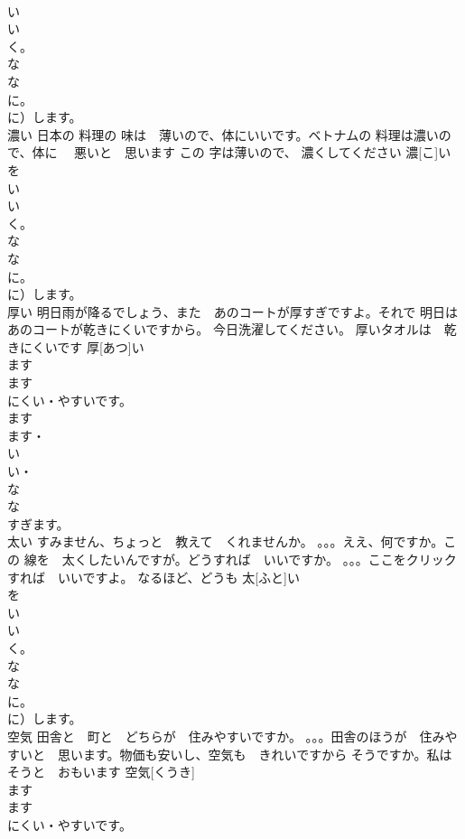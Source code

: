 \documentclass[8pt]{extreport}
\begin{document}
\begin{CJK}{UTF8}{min}
\\	い
\\	い
\\	く。
\\	な
\\	な
\\	に。
\\	に）します。
\\	濃い	日本の 料理の 味は　薄いので、体にいいです。ベトナムの 料理は濃いので、体に　 悪いと　思います この 字は薄いので、 濃くしてください	濃[こ]い				
\\	を
\\	い
\\	い
\\	く。
\\	な
\\	な
\\	に。
\\	に）します。
\\	厚い	明日雨が降るでしょう、また　あのコートが厚すぎですよ。それで 明日は　あのコートが乾きにくいですから。 今日洗濯してください。 厚いタオルは　乾きにくいです	厚[あつ]い				
\\	ます　
\\	ます
\\	にくい・やすいです。
\\	ます　
\\	ます・
\\	い
\\	い・
\\	な
\\	な
\\	すぎます。
\\	太い	すみません、ちょっと　教えて　くれませんか。 。。。ええ、何ですか。この 線を　太くしたいんですが。どうすれば　いいですか。 。。。ここをクリックすれば　いいですよ。 なるほど、どうも	太[ふと]い				
\\	を
\\	い
\\	い
\\	く。
\\	な
\\	な
\\	に。
\\	に）します。
\\	空気	田舎と　町と　どちらが　住みやすいですか。 。。。田舎のほうが　住みやすいと　思います。物価も安いし、空気も　きれいですから そうですか。私は　そうと　おもいます	空気[くうき]				
\\	ます　
\\	ます
\\	にくい・やすいです。

\end{CJK}
\end{document}
